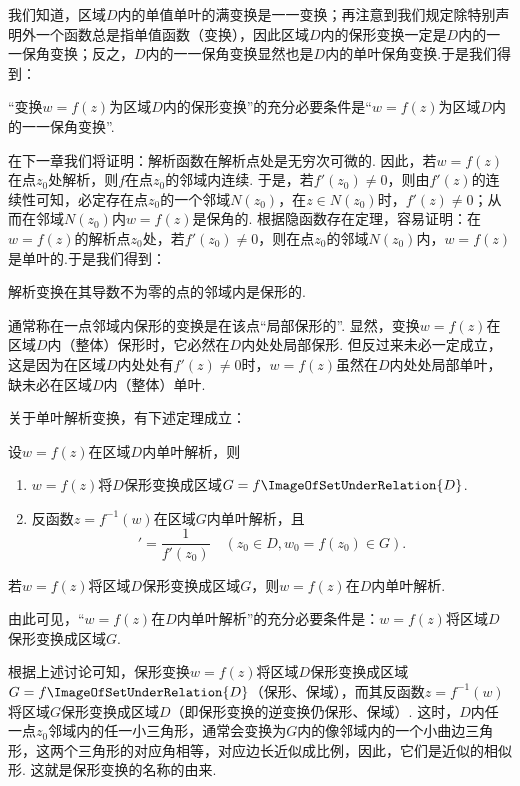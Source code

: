 我们知道，区域\(D\)内的单值单叶的满变换是一一变换；再注意到我们规定除特别声明外一个函数总是指单值函数（变换），因此区域\(D\)内的保形变换一定是\(D\)内的一一保角变换；反之，\(D\)内的一一保角变换显然也是\(D\)内的单叶保角变换.于是我们得到：
\begin{property}
“变换\(w = f(z)\)为区域\(D\)内的保形变换”的充分必要条件是“\(w = f(z)\)为区域\(D\)内的一一保角变换”.
\end{property}
在下一章我们将证明：解析函数在解析点处是无穷次可微的.
因此，若\(w = f(z)\)在点\(z_0\)处解析，则\(f\)在点\(z_0\)的邻域内连续.
于是，若\(f'(z_0)\neq0\)，则由\(f'(z)\)的连续性可知，必定存在点\(z_0\)的一个邻域\(N(z_0)\)，在\(z \in N(z_0)\)时，\(f'(z)\neq0\)；从而在邻域\(N(z_0)\)内\(w = f(z)\)是保角的.
根据隐函数存在定理，容易证明：在\(w = f(z)\)的解析点\(z_0\)处，若\(f'(z_0)\neq0\)，则在点\(z_0\)的邻域\(N(z_0)\)内，\(w = f(z)\)是单叶的.于是我们得到：
\begin{theorem}
解析变换在其导数不为零的点的邻域内是保形的.
\end{theorem}

通常称在一点邻域内保形的变换是在该点“局部保形的”.
显然，变换\(w = f(z)\)在区域\(D\)内（整体）保形时，它必然在\(D\)内处处局部保形.
但反过来未必一定成立，这是因为在区域\(D\)内处处有\(f'(z)\neq0\)时，\(w = f(z)\)虽然在\(D\)内处处局部单叶，缺未必在区域\(D\)内（整体）单叶.

关于单叶解析变换，有下述定理成立：
\begin{theorem}\label{theorem:解析函数.单叶解析变换的性质}
设\(w = f(z)\)在区域\(D\)内单叶解析，则\begin{enumerate}
\item \(w = f(z)\)将\(D\)保形变换成区域\(G = f\ImageOfSetUnderRelation{D}\).
\item 反函数\(z = f^{-1}(w)\)在区域\(G\)内单叶解析，且\begin{equation*}
[ f^{-1}(w_0) ]' = \frac{1}{f'(z_0)}
\quad(z_0 \in D, w_0 = f(z_0) \in G).
\end{equation*}
\end{enumerate}
\end{theorem}

\begin{theorem}
若\(w = f(z)\)将区域\(D\)保形变换成区域\(G\)，则\(w = f(z)\)在\(D\)内单叶解析.
\end{theorem}
由此可见，“\(w = f(z)\)在\(D\)内单叶解析”的充分必要条件是：\(w = f(z)\)将区域\(D\)保形变换成区域\(G\).

根据上述讨论可知，保形变换\(w = f(z)\)将区域\(D\)保形变换成区域\(G = f\ImageOfSetUnderRelation{D}\)（保形、保域），而其反函数\(z = f^{-1}(w)\)将区域\(G\)保形变换成区域\(D\)（即保形变换的逆变换仍保形、保域）.
这时，\(D\)内任一点\(z_0\)邻域内的任一小三角形，通常会变换为\(G\)内的像邻域内的一个小曲边三角形，这两个三角形的对应角相等，对应边长近似成比例，因此，它们是近似的相似形.
这就是保形变换的名称的由来.

